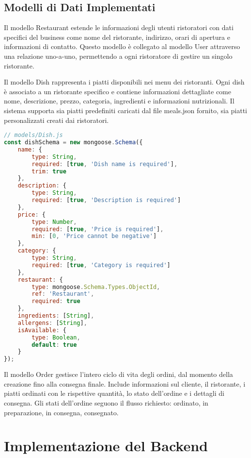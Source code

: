 \documentclass[12pt,a4paper]{article}
\begin{document}
\subsection{Modelli di Dati Implementati}

Il modello Restaurant estende le informazioni degli utenti ristoratori con dati specifici del business come nome del ristorante, indirizzo, orari di apertura e informazioni di contatto. Questo modello è collegato al modello User attraverso una relazione uno-a-uno, permettendo a ogni ristoratore di gestire un singolo ristorante.

Il modello Dish rappresenta i piatti disponibili nei menu dei ristoranti. Ogni dish è associato a un ristorante specifico e contiene informazioni dettagliate come nome, descrizione, prezzo, categoria, ingredienti e informazioni nutrizionali. Il sistema supporta sia piatti predefiniti caricati dal file meals.json fornito, sia piatti personalizzati creati dai ristoratori.

\begin{lstlisting}[language=JavaScript, caption=Schema del modello Dish]
// models/Dish.js
const dishSchema = new mongoose.Schema({
    name: {
        type: String,
        required: [true, 'Dish name is required'],
        trim: true
    },
    description: {
        type: String,
        required: [true, 'Description is required']
    },
    price: {
        type: Number,
        required: [true, 'Price is required'],
        min: [0, 'Price cannot be negative']
    },
    category: {
        type: String,
        required: [true, 'Category is required']
    },
    restaurant: {
        type: mongoose.Schema.Types.ObjectId,
        ref: 'Restaurant',
        required: true
    },
    ingredients: [String],
    allergens: [String],
    isAvailable: {
        type: Boolean,
        default: true
    }
});
\end{lstlisting}

Il modello Order gestisce l'intero ciclo di vita degli ordini, dal momento della creazione fino alla consegna finale. Include informazioni sul cliente, il ristorante, i piatti ordinati con le rispettive quantità, lo stato dell'ordine e i dettagli di consegna. Gli stati dell'ordine seguono il flusso richiesto: ordinato, in preparazione, in consegna, consegnato.

\section{Implementazione del Backend}
\end{document}
